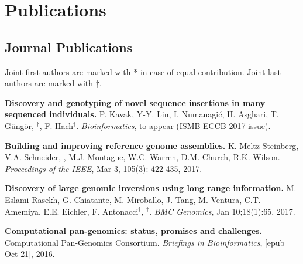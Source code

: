 \section{\sc Publications}
                                       
                                       \vspace{-0.5cm}
                                       
                                       \subsection{\small \sc Journal Publications}
                                       \vspace{-0.6cm}
                                       
                                       \small{
                                         Joint first authors are marked with * in case of equal contribution. Joint last authors are marked with $\ddag$.
                                       }

                                       

  \vspace{-.2cm}        
         {\bf Discovery and genotyping of novel sequence insertions in many sequenced individuals.}
         P. Kavak, Y-Y. Lin, I. Numanagić, H. Asghari, T. Güngör, \calkan{}$^\ddag$, F. Hach$^\ddag$.
         {\em Bioinformatics}, to appear (ISMB-ECCB 2017 issue).

  \vspace{-.2cm}        
         {\bf Building and improving reference genome assemblies.} K. Meltz-Steinberg, V.A. Schneider, \calkan{}, M.J. Montague, W.C. Warren, D.M. Church, R.K. Wilson.
         {\em Proceedings of the IEEE}, Mar 3, 105(3): 422-435, 2017.



  \vspace{-.2cm}        
         {\bf Discovery of large genomic inversions using long
range information.} M. Eslami Rasekh, G. Chiatante, M. Miroballo, J. Tang, M. Ventura, C.T. Amemiya, E.E. Eichler, F. Antonacci$^\ddag$, \calkan{}$^\ddag$.
         {\em BMC Genomics}, Jan 10;18(1):65, 2017.

         \vspace{-.2cm}        

         {\bf Computational pan-genomics: status, promises and challenges.}
         Computational Pan-Genomics Consortium. {\em Briefings in Bioinformatics}, [epub Oct 21], 2016.
         
